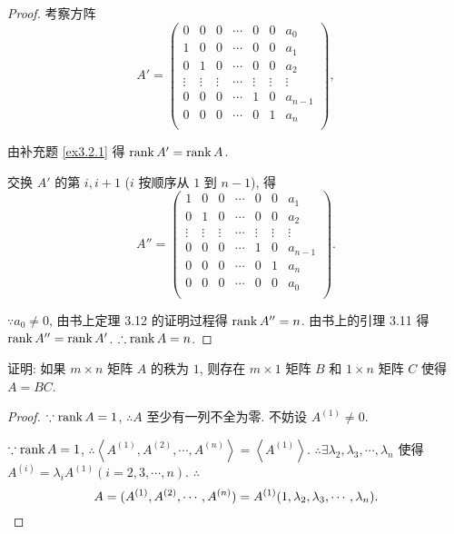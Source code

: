 \documentclass{ctexart}
\begin{document}
\begin{proof}
    考察方阵
    \[A'=\begin{pmatrix}
        0 & 0 & 0 & \cdots & 0 & 0 & a_0 \\
        1 & 0 & 0 & \cdots & 0 & 0 & a_1 \\
        0 & 1 & 0 & \cdots & 0 & 0 & a_2 \\
        \vdots & \vdots & \vdots & \cdots & \vdots & \vdots & \vdots \\
        0 & 0 & 0 & \cdots & 1 & 0 & a_{n-1} \\
        0 & 0 & 0 & \cdots & 0 & 1 & a_n \\
    \end{pmatrix},\]

    由补充题 \ref{ex3.2.1} 得 $\operatorname{rank} A'=\operatorname{rank} A$.

    交换 $A'$ 的第 $i,i+1$ ($i$ 按顺序从 $1$ 到 $n-1$), 得
    \[A''=\begin{pmatrix}
        1 & 0 & 0 & \cdots & 0 & 0 & a_1 \\
        0 & 1 & 0 & \cdots & 0 & 0 & a_2 \\
        \vdots & \vdots & \vdots & \cdots & \vdots & \vdots & \vdots \\
        0 & 0 & 0 & \cdots & 1 & 0 & a_{n-1} \\
        0 & 0 & 0 & \cdots & 0 & 1 & a_n \\
        0 & 0 & 0 & \cdots & 0 & 0 & a_0 \\
    \end{pmatrix}.\]

    $\because a_0\neq0$, 由书上定理 3.12 的证明过程得 $\operatorname{rank} A''=n$. 由书上的引理 3.11 得 $\operatorname{rank} A''=\operatorname{rank} A'$. $\therefore\operatorname{rank} A=n$.
\end{proof}
\begin{exercisec}[3.3.6]\label{ex3.3.6}
    证明: 如果 $m\times n$ 矩阵 $A$ 的秩为 $1$, 则存在 $m\times1$ 矩阵 $B$ 和 $1\times n$ 矩阵 $C$ 使得 $A=BC$.
\end{exercisec}
\begin{proof}
    $\because\operatorname{rank} A=1$, $\therefore A$ 至少有一列不全为零. 不妨设 $A^{(1)}\neq0$.
    
    $\because\operatorname{rank} A=1$, $\therefore\left<A^{(1)},A^{(2)},\cdots,A^{(n)}\right>=\left<A^{(1)}\right>$. $\therefore\exists\lambda_2,\lambda_3,\cdots,\lambda_n$ 使得 $A^{(i)}=\lambda_iA^{(1)}(i=2,3,\cdots,n)$. $\therefore$
    \[A=(A^{(1)},A^{(2)},\cdots,A^{(n)})=A^{(1)}(1,\lambda_2,\lambda_3,\cdots,\lambda_n).\qedhere\]
\end{proof}
\end{document}

